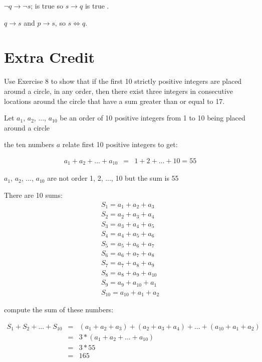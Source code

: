 \documentclass[11pt]{article}
\begin{document}
{\begin{itemize}
\begin{itemize}
\begin{itemize}
	 $\neg q \rightarrow \neg s$; is true so $s \rightarrow q$ is true .
	
	\end{itemize}
	 $q \rightarrow s$ and $p \rightarrow s$, so $s \Leftrightarrow q$.
	
	\end{itemize}
	
	\section*{Extra Credit}
Use Exercise 8 to show that if the first 10 strictly positive integers are placed around a circle, in any order, then there exist three integers in consecutive locations around the circle that have a sum greater than or equal to 17.


Let $a_{1}$, $a_{2}$, ..., $a_{10}$ be an order of 10 positive integers from 1 to 10 being placed around a circle




 the ten numbers $a$ relate first 10 positive integers to get:

\begin{eqnarray}
a_{1} + a_{2} + ... + a_{10} & = & 1 + 2 + ... + 10 = 55
\end{eqnarray}

 $a_{1}$, $a_{2}$, ..., $a_{10}$ are not order 1, 2, ..., 10 but the sum is 55





 There are
10 sums:
\begin{eqnarray*}
S_1 = a_1 + a_2 + a_3 \\
S_2 = a_2 + a_3 + a_4 \\
S_3 = a_3 + a_4 + a_5 \\
S_4 = a_4 + a_5 + a_6 \\
S_5 = a_5 + a_6 + a_7 \\
S_6 = a_6 + a_7 + a_8 \\
S_7 = a_7 + a_8 + a_9 \\
S_8 = a_8 + a_9 + a_{10} \\
S_9 = a_9 + a_{10} + a_1 \\
S_{10} = a_{10} + a_1 + a_2 
\end{eqnarray*}

 compute the sum of these numbers:

\begin{eqnarray*}
S_{1} + S_{2} + ... + S_{10} & = & (a_{1} + a_{2} + a_{3}) + (a_{2} + a_{3} + a_{4}) + ... + (a_{10} + a_{1} + a_{2})\\
& = & 3 \ast (a_{1} + a_{2} + ... + a_{10})\\
& = & 3 \ast 55\\
& = & 165
\end{eqnarray*}


\end{itemize}}
\end{document}
